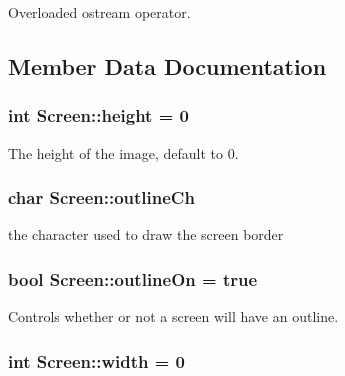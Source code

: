 Overloaded ostream operator. 



\subsection{Member Data Documentation}
\hypertarget{classScreen_a55405920693276db8fbdbf3a903b8d2f}{
\subsubsection[{height}]{\setlength{\rightskip}{0pt plus 5cm}int Screen\-::height = 0\hspace{0.3cm}{\ttfamily [protected]}}}\label{classScreen_a55405920693276db8fbdbf3a903b8d2f}


The height of the image, default to 0. 

\hypertarget{classScreen_a0b59df2bfafff7a121286a5ea40503b6}{
\subsubsection[{outline\-Ch}]{\setlength{\rightskip}{0pt plus 5cm}char Screen\-::outline\-Ch}}\label{classScreen_a0b59df2bfafff7a121286a5ea40503b6}


the character used to draw the screen border 

\hypertarget{classScreen_a6f906b745f406576d9f7aeaec330c9d6}{
\subsubsection[{outline\-On}]{\setlength{\rightskip}{0pt plus 5cm}bool Screen\-::outline\-On = true}}\label{classScreen_a6f906b745f406576d9f7aeaec330c9d6}


Controls whether or not a screen will have an outline. 

\hypertarget{classScreen_a49be8f8ccf7ed7a3151a761495c0ce21}{
\subsubsection[{width}]{\setlength{\rightskip}{0pt plus 5cm}int Screen\-::width = 0\hspace{0.3cm}{\ttfamily [protected]}}}\label{classScreen_a49be8f8ccf7ed7a3151a761495c0ce21}


